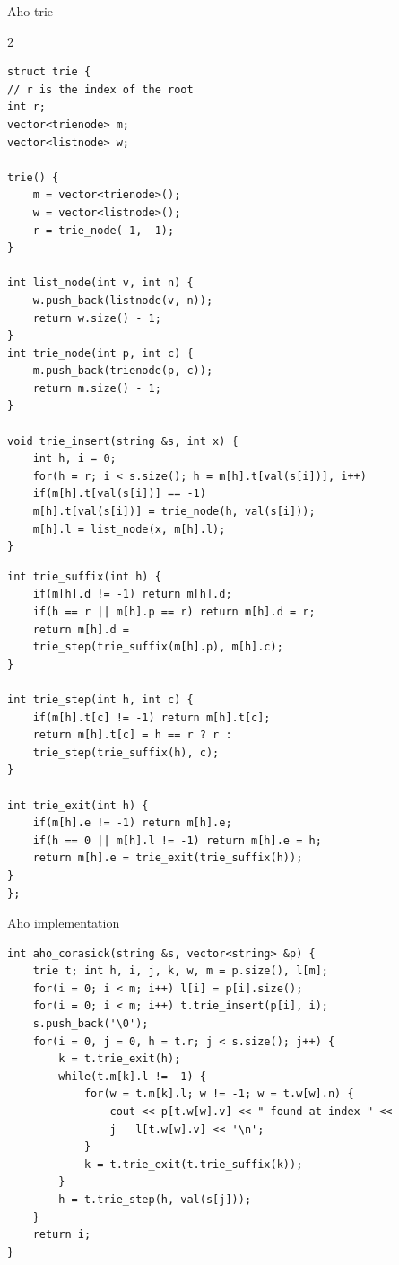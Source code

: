 \documentclass{beamer}
\begin{document}
	\begin{frame}{Aho trie}
		\tiny
		\begin{multicols}{2}
			\begin{verbatim}
struct trie { 
// r is the index of the root
int r;
vector<trienode> m;
vector<listnode> w;

trie() {
	m = vector<trienode>();
	w = vector<listnode>();
	r = trie_node(-1, -1);
}

int list_node(int v, int n) {
	w.push_back(listnode(v, n));
	return w.size() - 1;
}
int trie_node(int p, int c) {
	m.push_back(trienode(p, c));
	return m.size() - 1;
}

void trie_insert(string &s, int x) {
	int h, i = 0;
	for(h = r; i < s.size(); h = m[h].t[val(s[i])], i++)
	if(m[h].t[val(s[i])] == -1)
	m[h].t[val(s[i])] = trie_node(h, val(s[i]));
	m[h].l = list_node(x, m[h].l);
}
				\end{verbatim}
				\columnbreak
				\begin{verbatim}
int trie_suffix(int h) {
	if(m[h].d != -1) return m[h].d;
	if(h == r || m[h].p == r) return m[h].d = r;
	return m[h].d = 
	trie_step(trie_suffix(m[h].p), m[h].c);
}

int trie_step(int h, int c) {
	if(m[h].t[c] != -1) return m[h].t[c];
	return m[h].t[c] = h == r ? r :
	trie_step(trie_suffix(h), c);
}

int trie_exit(int h) {
	if(m[h].e != -1) return m[h].e;
	if(h == 0 || m[h].l != -1) return m[h].e = h;
	return m[h].e = trie_exit(trie_suffix(h));
}
};
			\end{verbatim}
		\end{multicols}
	\end{frame}
	
	\begin{frame}{Aho implementation}
		\vspace{-25pt}
		\scriptsize
		\begin{verbatim}
int aho_corasick(string &s, vector<string> &p) {
	trie t; int h, i, j, k, w, m = p.size(), l[m];
	for(i = 0; i < m; i++) l[i] = p[i].size();
	for(i = 0; i < m; i++) t.trie_insert(p[i], i);
	s.push_back('\0');
	for(i = 0, j = 0, h = t.r; j < s.size(); j++) {
		k = t.trie_exit(h);
		while(t.m[k].l != -1) {
			for(w = t.m[k].l; w != -1; w = t.w[w].n) {
				cout << p[t.w[w].v] << " found at index " << 
				j - l[t.w[w].v] << '\n';
			}
			k = t.trie_exit(t.trie_suffix(k));
		}
		h = t.trie_step(h, val(s[j]));
	}
	return i;
}
		\end{verbatim}
	\end{frame}
\end{document}
